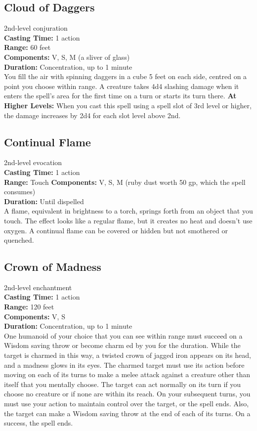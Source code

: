 \documentclass[11pt, A4paper, english]{article}
\begin{document}
		\subsection{Cloud of Daggers}
2nd-level conjuration \\
\textbf{Casting Time:} 1 action \\
\textbf{Range:} 60 feet \\
\textbf{Components:} V, S, M (a sliver of glass) \\
\textbf{Duration:} Concentration, up to 1 minute \\
You fill the air with spinning daggers in a cube 5 feet on each side, centred on a point you choose within range. A creature takes 4d4 slashing damage when it enters the spell’s area for the first time on a turn or starts its turn there.
\textbf{At Higher Levels:} When you cast this spell using a spell slot of 3rd level or higher, the damage increases by 2d4 for each slot level above 2nd.

		\subsection{Continual Flame}
2nd-level evocation \\
\textbf{Casting Time:} 1 action \\
\textbf{Range:} Touch
\textbf{Components:} V, S, M (ruby dust worth 50 gp, which the spell consumes) \\
\textbf{Duration:} Until dispelled \\
A flame, equivalent in brightness to a torch, springs forth from an object that you touch. The effect looks like a regular flame, but it creates no heat and doesn’t use oxygen. A continual flame can be covered or hidden but not smothered or quenched.

		\subsection{Crown of Madness}
2nd-level enchantment \\
\textbf{Casting Time:} 1 action \\
\textbf{Range:} 120 feet \\
\textbf{Components:} V, S \\
\textbf{Duration:} Concentration, up to 1 minute \\
One humanoid of your choice that you can see within range must succeed on a Wisdom saving throw or become charm ed by you for the duration. While the target is charmed in this way, a twisted crown of jagged iron appears on its head, and a madness glows in its eyes. The charmed target must use its action before moving on each of its turns to make a melee attack against a creature other than itself that you mentally choose. The target can act normally on its turn if you choose no creature or if none are within its reach. On your subsequent turns, you must use your action to maintain control over the target, or the spell ends. Also, the target can make a Wisdom saving throw at the end of each of its turns. On a success, the spell ends.
\end{document}
